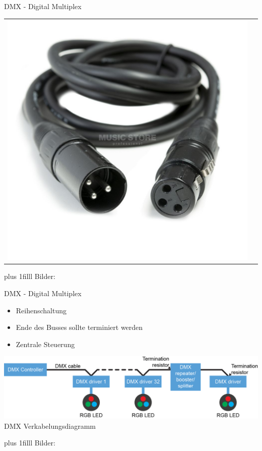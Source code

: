 \documentclass[Nike]{tuberlinbeamer}
\newcommand{\customcite}[1]{
	\vskip0pt plus 1filll
	\color{grau}
	\raggedleft \tiny Bilder: \cite{#1}
}
\begin{document}
\begin{frame}{DMX - Digital Multiplex}
\begin{tabular}{cl}
{			\includegraphics[scale= 0.1]{pictures/dmx-cable}
		}
	\end{tabular}
	\customcite{led_matrix_lightshow, dmx_cable}
\end{frame}


\begin{frame}{DMX - Digital Multiplex}
	\centering
	\begin{itemize}
		\item Reihenschaltung
		\item Ende des Busses sollte terminiert werden
		\item Zentrale Steuerung
	\end{itemize}
	\includegraphics[width=\textwidth - 25pt]{pictures/dmxWiringDiagram.png}\\
	DMX Verkabelungsdiagramm
	\customcite{dmx_timing}
\end{frame}
\end{document}

